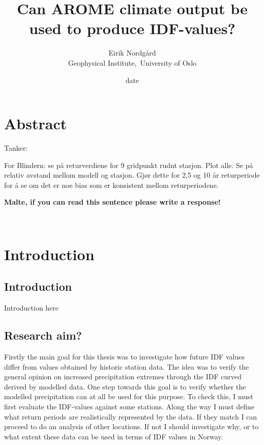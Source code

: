 \documentclass[12pt]{article}
\begin{document}
\title{Can AROME climate output be used to produce IDF-values?}
\date{date}
\author{Eirik Nordgård\\ Geophysical Institute,\ University of Oslo}


\maketitle
\section{Abstract}

Tanker: 

For Blindern: se på returverdiene for 9 gridpunkt rudnt stasjon. Plot alle.  Se på relativ avstand mellom modell og stasjon. Gjør dette for 2,5 og 10 år returperiode for å se om det er noe bias som er konsistent mellom returperiodene. 


\textbf{Malte, if you can read this sentence please write a response!} 

\
\section{Introduction}

\subsection{Introduction}
Introduction here 
\subsection{Research aim?}
Firstly the main goal for this thesis was to investigate how future IDF values differ from values obtained by historic station data. The idea was to verify the general opinion on increased precipitation extremes through the IDF curved derived by modelled data. One step towards this goal is to verify whether the modelled precipitation can at all be used for this purpose. To check this, I must first evaluate the IDF-values against some stations. Along the way I must define what return periods are realistically represented by the data. If they match I can proceed to do an analysis of other locations. If not I should investigate why, or to what extent these data can be used in terms of IDF values in Norway.
\end{document}

